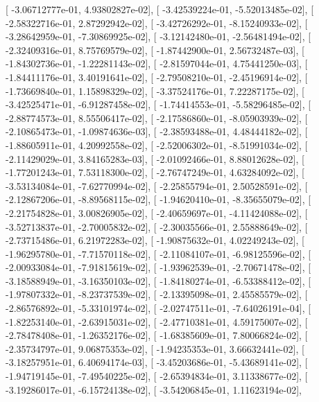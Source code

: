 \documentclass{article}
\begin{document}
       [ -3.06712777e-01,   4.93802827e-02],
       [ -3.42539224e-01,  -5.52013485e-02],
       [ -2.58322716e-01,   2.87292942e-02],
       [ -3.42726292e-01,  -8.15240933e-02],
       [ -3.28642959e-01,  -7.30869925e-02],
       [ -3.12142480e-01,  -2.56481494e-02],
       [ -2.32409316e-01,   8.75769579e-02],
       [ -1.87442900e-01,   2.56732487e-03],
       [ -1.84302736e-01,  -1.22281143e-02],
       [ -2.81597044e-01,   4.75441250e-03],
       [ -1.84411176e-01,   3.40191641e-02],
       [ -2.79508210e-01,  -2.45196914e-02],
       [ -1.73669840e-01,   1.15898329e-02],
       [ -3.37524176e-01,   7.22287175e-02],
       [ -3.42525471e-01,  -6.91287458e-02],
       [ -1.74414553e-01,  -5.58296485e-02],
       [ -2.88774573e-01,   8.55506417e-02],
       [ -2.17586860e-01,  -8.05903939e-02],
       [ -2.10865473e-01,  -1.09874636e-03],
       [ -2.38593488e-01,   4.48444182e-02],
       [ -1.88605911e-01,   4.20992558e-02],
       [ -2.52006302e-01,  -8.51991034e-02],
       [ -2.11429029e-01,   3.84165283e-03],
       [ -2.01092466e-01,   8.88012628e-02],
       [ -1.77201243e-01,   7.53118300e-02],
       [ -2.76747249e-01,   4.63284092e-02],
       [ -3.53134084e-01,  -7.62770994e-02],
       [ -2.25855794e-01,   2.50528591e-02],
       [ -2.12867206e-01,  -8.89568115e-02],
       [ -1.94620410e-01,  -8.35655079e-02],
       [ -2.21754828e-01,   3.00826905e-02],
       [ -2.40659697e-01,  -4.11424088e-02],
       [ -3.52713837e-01,  -2.70005832e-02],
       [ -2.30035566e-01,   2.55888649e-02],
       [ -2.73715486e-01,   6.21972283e-02],
       [ -1.90875632e-01,   4.02249243e-02],
       [ -1.96295780e-01,  -7.71570118e-02],
       [ -2.11084107e-01,  -6.98125596e-02],
       [ -2.00933084e-01,  -7.91815619e-02],
       [ -1.93962539e-01,  -2.70671478e-02],
       [ -3.18588949e-01,  -3.16350103e-02],
       [ -1.84180274e-01,  -6.53388412e-02],
       [ -1.97807332e-01,  -8.23737539e-02],
       [ -2.13395098e-01,   2.45585579e-02],
       [ -2.86576892e-01,  -5.33101974e-02],
       [ -2.02747511e-01,  -7.64026191e-04],
       [ -1.82253140e-01,  -2.63915031e-02],
       [ -2.47710381e-01,   4.59175007e-02],
       [ -2.78478408e-01,  -1.26352176e-02],
       [ -1.68385609e-01,   7.80066824e-02],
       [ -2.35734797e-01,   9.06875353e-02],
       [ -1.94235353e-01,   3.66632441e-02],
       [ -3.18257951e-01,   6.40694174e-03],
       [ -3.45203686e-01,  -5.43689141e-02],
       [ -1.94719145e-01,  -7.49540225e-02],
       [ -2.65394834e-01,   3.11338677e-02],
       [ -3.19286017e-01,  -6.15724138e-02],
       [ -3.54206845e-01,   1.11623194e-02],
\end{document}
